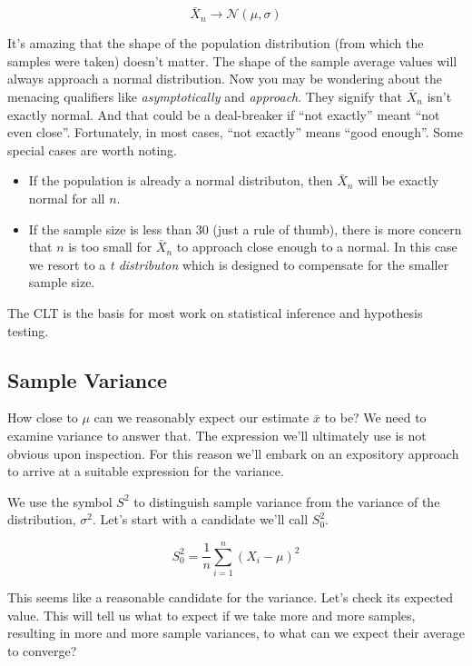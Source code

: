 \documentclass[]{article}
\begin{document}
$$
\bar{X}_n \rightarrow \mathcal{N}(\mu, \sigma)
$$

It's amazing that the shape of the population distribution
(from which the samples were taken) doesn't matter.  The shape
of the sample average values will always approach
a normal distribution.  Now you may be wondering about the
menacing qualifiers like \emph{asymptotically} and
\emph{approach}.  They signify that $\bar{X}_n$ isn't exactly
normal.  And that could be a deal-breaker if ``not exactly''
meant ``not even close''.  Fortunately, in most cases,
``not exactly'' means ``good enough''.  Some special cases
are worth noting.

\begin{itemize}

\item If the population is already a normal distributon,
then $\bar{X}_n$ will be exactly normal for all $n$.

\item If the sample size is less than 30 (just a rule of
thumb), there is more concern that $n$ is too small
for $\bar{X}_n$ to approach close enough to a normal.  In
this case we resort to a \emph{t distributon} which is
designed to compensate for the smaller sample size.
\end{itemize}

The CLT is the basis for most work on statistical inference
and hypothesis testing.


\subsection{Sample Variance}


How close to $\mu$ can we reasonably expect our estimate $\bar{x}$ to be?
We need to examine variance to answer that.  The expression we'll ultimately
use is not obvious upon inspection.  For this reason we'll
embark on an expository approach to arrive at a suitable expression
for the variance.

We use the symbol $S^2$ to distinguish sample variance from the
variance of the distribution, $\sigma^2$.  Let's start with a
candidate we'll call $S_0^2$.

\begin{equation} \label{s0}
S_0^2 = \frac{1}{n} \sum_{i=1}^n (X_i - \mu)^2
\end{equation}

This seems like a reasonable candidate for the variance.  Let's
check its expected value.  This will tell us what to expect if
we take more and more samples, resulting in more and more sample
variances, to what can we expect their average to converge?
\end{document}
